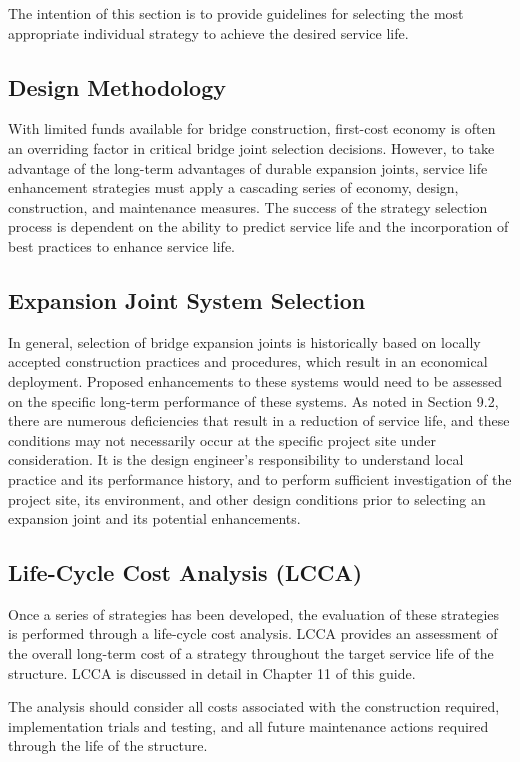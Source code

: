 The intention of this section is to provide guidelines for selecting the most appropriate individual strategy to
achieve the desired service life.

\subsection{Design Methodology}
With limited funds available for bridge construction, first-cost economy is often an overriding factor in critical
bridge joint selection decisions. However, to take advantage of the long-term advantages of durable expansion joints,
service life enhancement strategies must apply a cascading series of economy, design, construction, and maintenance
measures. The success of the strategy selection process is dependent on the ability to predict service life and the
incorporation of best practices to enhance service life.

\subsection{Expansion Joint System Selection}
In general, selection of bridge expansion joints is historically based on locally accepted construction practices
and procedures, which result in an economical deployment. Proposed enhancements to these systems would need to
be assessed on the specific long-term performance of these systems. As noted in Section 9.2, there are numerous
deficiencies that result in a reduction of service life, and these conditions may not necessarily occur at the specific
project site under consideration. It is the design engineer’s responsibility to understand local practice and its
performance history, and to perform sufficient investigation of the project site, its environment, and other design
conditions prior to selecting an expansion joint and its potential enhancements.


\subsection{Life-Cycle Cost Analysis (LCCA)}
Once a series of strategies has been developed, the evaluation of these strategies is performed through a life-cycle
cost analysis. LCCA provides an assessment of the overall long-term cost of a strategy throughout the target service
life of the structure. LCCA is discussed in detail in Chapter 11 of this guide.

The analysis should consider all costs associated with the construction required, implementation trials and
testing, and all future maintenance actions required through the life of the structure.

